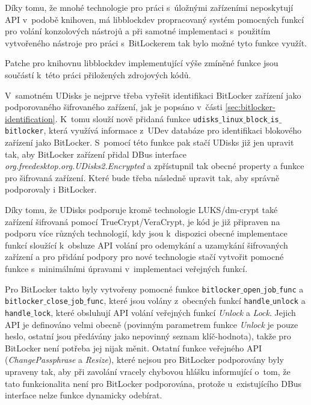 Díky tomu, že mnohé technologie pro práci s~úložnými zařízeními neposkytují API v~podobě knihoven, má libblockdev propracovaný systém pomocných funkcí pro volání konzolových nástrojů a při samotné implementaci s~použitím vytvořeného nástroje pro práci s~BitLockerem tak bylo možné tyto funkce využít.

Patche pro knihovnu libblockdev implementující výše zmíněné funkce jsou součástí k~této práci přiložených zdrojových kódů.

\label{sec:udisks-implementation}

V~samotném UDisks je nejprve třeba vyřešit identifikaci BitLocker zařízení jako podporovaného šifrovaného zařízení, jak je popsáno v~části \ref{sec:bitlocker-identification}. K~tomu slouží nově přidaná funkce \texttt{udisks$\_$linux$\_$block$\_$is$\_$bitlocker}, která využívá informace z~UDev databáze pro identifikaci blokového zařízení jako BitLocker. S~pomocí této funkce pak stačí UDisks již jen upravit tak, aby BitLocker zařízení přidal DBus interface \emph{org.freedesktop.org.UDisks2.Encrypted} a zpřístupnil tak obecné property a funkce pro šifrovaná zařízení. Které bude třeba následně upravit tak, aby správně podporovaly i BitLocker.

Díky tomu, že UDisks podporuje kromě technologie LUKS/dm-crypt také zařízení šifrovaná pomocí TrueCrypt/VeraCrypt, je kód je již připraven na podporu více různých technologií, kdy jsou k~dispozici obecné implementace funkcí sloužící k~obsluze API volání pro odemykání a uzamykání šifrovaných zařízení a pro přidání podpory pro nové technologie stačí vytvořit pomocné funkce s~minimálními úpravami v~implementaci veřejných funkcí.

Pro BitLocker takto byly vytvořeny pomocné funkce \texttt{bitlocker$\_$open$\_$job$\_$func} a \texttt{bitlocker$\_$close$\_$job$\_$func}, které jsou volány z~obecných funkcí \texttt{handle$\_$unlock} a \texttt{handle$\_$lock}, které obsluhují API volání veřejných funkcí \emph{Unlock} a \emph{Lock}. Jejich API je definováno velmi obecně (povinným parametrem funkce \emph{Unlock} je pouze heslo, ostatní jsou předávány jako nepovinný seznam klíč-hodnota\cite{Storaged2019}), takže pro BitLocker není potřeba jej nijak měnit. Ostatní funkce veřejného API (\emph{ChangePassphrase} a \emph{Resize}), které nejsou pro BitLocker podporovány byly upraveny tak, aby při zavolání vracely chybovou hlášku informující o~tom, že tato funkcionalita není pro BitLocker podporována, protože u~existujícího DBus interface nelze funkce dynamicky odebírat.

